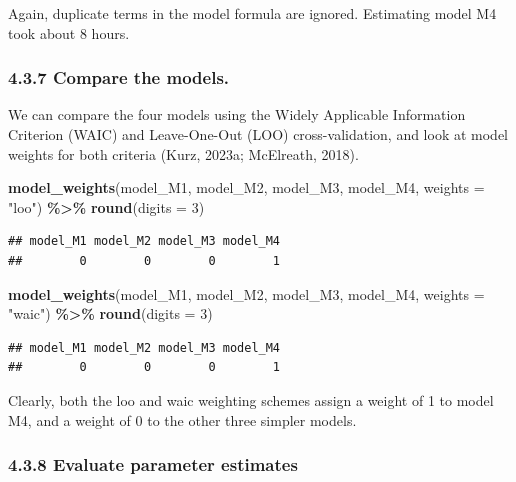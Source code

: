 \documentclass[
  man,floatsintext]{apa6}
\newenvironment{Shaded}{\begin{snugshade}}{\end{snugshade}}
\newcommand{\AttributeTok}[1]{\textcolor[rgb]{0.13,0.29,0.53}{#1}}
\newcommand{\DecValTok}[1]{\textcolor[rgb]{0.00,0.00,0.81}{#1}}
\newcommand{\FunctionTok}[1]{\textcolor[rgb]{0.13,0.29,0.53}{\textbf{#1}}}
\newcommand{\NormalTok}[1]{#1}
\newcommand{\SpecialCharTok}[1]{\textcolor[rgb]{0.81,0.36,0.00}{\textbf{#1}}}
\newcommand{\StringTok}[1]{\textcolor[rgb]{0.31,0.60,0.02}{#1}}
\begin{document}
\normalsize

Again, duplicate terms in the model formula are ignored. Estimating model M4 took about 8 hours.

\subsubsection{4.3.7 Compare the models.}\label{compare-the-models.}

We can compare the four models using the Widely Applicable Information Criterion (WAIC) and Leave-One-Out (LOO) cross-validation, and look at model weights for both criteria (Kurz, 2023a; McElreath, 2018).

\scriptsize

\begin{Shaded}
\begin{Highlighting}[]
\FunctionTok{model\_weights}\NormalTok{(model\_M1, model\_M2, model\_M3, model\_M4, }\AttributeTok{weights =} \StringTok{"loo"}\NormalTok{) }\SpecialCharTok{\%\textgreater{}\%} \FunctionTok{round}\NormalTok{(}\AttributeTok{digits =} \DecValTok{3}\NormalTok{)}
\end{Highlighting}
\end{Shaded}

\begin{verbatim}
## model_M1 model_M2 model_M3 model_M4 
##        0        0        0        1
\end{verbatim}

\begin{Shaded}
\begin{Highlighting}[]
\FunctionTok{model\_weights}\NormalTok{(model\_M1, model\_M2, model\_M3, model\_M4, }\AttributeTok{weights =} \StringTok{"waic"}\NormalTok{) }\SpecialCharTok{\%\textgreater{}\%} \FunctionTok{round}\NormalTok{(}\AttributeTok{digits =} \DecValTok{3}\NormalTok{)}
\end{Highlighting}
\end{Shaded}

\begin{verbatim}
## model_M1 model_M2 model_M3 model_M4 
##        0        0        0        1
\end{verbatim}

\normalsize

Clearly, both the loo and waic weighting schemes assign a weight of 1 to model M4, and a weight of 0 to the other three simpler models.

\subsubsection{4.3.8 Evaluate parameter estimates}\label{evaluate-parameter-estimates}
\end{document}
